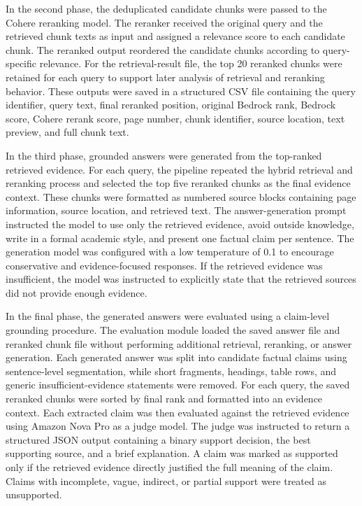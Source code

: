 In the second phase, the deduplicated candidate chunks were passed to the Cohere reranking model. The reranker received the original query and the retrieved chunk texts as input and assigned a relevance score to each candidate chunk. The reranked output reordered the candidate chunks according to query-specific relevance. For the retrieval-result file, the top 20 reranked chunks were retained for each query to support later analysis of retrieval and reranking behavior. These outputs were saved in a structured CSV file containing the query identifier, query text, final reranked position, original Bedrock rank, Bedrock score, Cohere rerank score, page number, chunk identifier, source location, text preview, and full chunk text.

In the third phase, grounded answers were generated from the top-ranked retrieved evidence. For each query, the pipeline repeated the hybrid retrieval and reranking process and selected the top five reranked chunks as the final evidence context. These chunks were formatted as numbered source blocks containing page information, source location, and retrieved text. The answer-generation prompt instructed the model to use only the retrieved evidence, avoid outside knowledge, write in a formal academic style, and present one factual claim per sentence. The generation model was configured with a low temperature of 0.1 to encourage conservative and evidence-focused responses. If the retrieved evidence was insufficient, the model was instructed to explicitly state that the retrieved sources did not provide enough evidence.

In the final phase, the generated answers were evaluated using a claim-level grounding procedure. The evaluation module loaded the saved answer file and reranked chunk file without performing additional retrieval, reranking, or answer generation. Each generated answer was split into candidate factual claims using sentence-level segmentation, while short fragments, headings, table rows, and generic insufficient-evidence statements were removed. For each query, the saved reranked chunks were sorted by final rank and formatted into an evidence context. Each extracted claim was then evaluated against the retrieved evidence using Amazon Nova Pro as a judge model. The judge was instructed to return a structured JSON output containing a binary support decision, the best supporting source, and a brief explanation. A claim was marked as supported only if the retrieved evidence directly justified the full meaning of the claim. Claims with incomplete, vague, indirect, or partial support were treated as unsupported.

